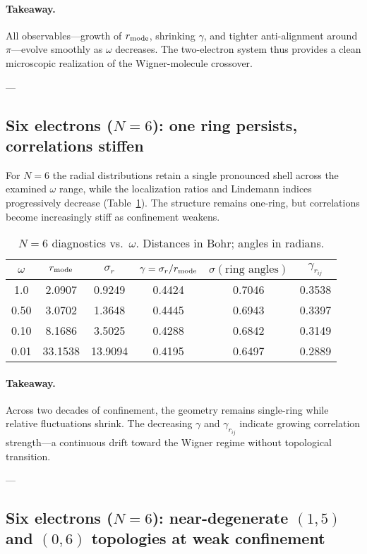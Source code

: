 \paragraph{Takeaway.}
All observables—growth of $r_{\rm mode}$, shrinking $\gamma$, and tighter anti-alignment around $\pi$—evolve smoothly as $\omega$ decreases.  
The two-electron system thus provides a clean microscopic realization of the Wigner-molecule crossover.

---

\subsection{Six electrons ($N=6$): one ring persists, correlations stiffen}
For $N=6$ the radial distributions retain a single pronounced shell across the examined $\omega$ range, while the localization ratios and Lindemann indices progressively decrease (Table~\ref{tab:N6}).  
The structure remains one-ring, but correlations become increasingly stiff as confinement weakens.

\begin{table}[H]
\centering
\caption{$N=6$ diagnostics vs.\ $\omega$. Distances in Bohr; angles in radians.}
\label{tab:N6}
\begin{tabular}{c|ccccc}
\toprule
$\omega$ & $r_{\rm mode}$ & $\sigma_r$ & $\gamma=\sigma_r/r_{\rm mode}$ & $\sigma(\text{ring angles})$ & $\gamma_{r_{ij}}$ \\
\midrule
1.0  & 2.0907 & 0.9249 & 0.4424 & 0.7046 & 0.3538 \\
0.50 & 3.0702 & 1.3648 & 0.4445 & 0.6943 & 0.3397 \\
0.10 & 8.1686 & 3.5025 & 0.4288 & 0.6842 & 0.3149 \\
0.01 & 33.1538 & 13.9094 & 0.4195 & 0.6497 & 0.2889 \\
\bottomrule
\end{tabular}
\end{table}

\paragraph{Takeaway.}
Across two decades of confinement, the geometry remains single-ring while relative fluctuations shrink.  
The decreasing $\gamma$ and $\gamma_{r_{ij}}$ indicate growing correlation strength—a continuous drift toward the Wigner regime without topological transition.

---

\subsection{Six electrons ($N=6$): near-degenerate $(1,5)$ and $(0,6)$ topologies at weak confinement}

